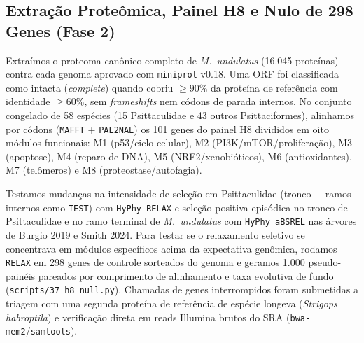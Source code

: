 \documentclass[10pt,a4paper,twocolumn]{article}
\begin{document}
\subsection{Extração Proteômica, Painel H8 e Nulo de 298 Genes (Fase 2)}
Extraímos o proteoma canônico completo de \textit{M.\ undulatus} (16.045 proteínas) contra cada genoma aprovado com \texttt{miniprot} v0.18. Uma ORF foi classificada como intacta (\textit{complete}) quando cobriu $\ge 90\%$ da proteína de referência com identidade $\ge 60\%$, sem \textit{frameshifts} nem códons de parada internos. No conjunto congelado de 58 espécies (15 Psittaculidae e 43 outros Psittaciformes), alinhamos por códons (\texttt{MAFFT} + \texttt{PAL2NAL}) os 101 genes do painel H8 divididos em oito módulos funcionais: M1 (p53/ciclo celular), M2 (PI3K/mTOR/proliferação), M3 (apoptose), M4 (reparo de DNA), M5 (NRF2/xenobióticos), M6 (antioxidantes), M7 (telômeros) e M8 (proteostase/autofagia).

Testamos mudanças na intensidade de seleção em Psittaculidae (tronco + ramos internos como \texttt{TEST}) com \texttt{HyPhy RELAX} e seleção positiva episódica no tronco de Psittaculidae e no ramo terminal de \textit{M.\ undulatus} com \texttt{HyPhy aBSREL} nas árvores de Burgio 2019 e Smith 2024. Para testar se o relaxamento seletivo se concentrava em módulos específicos acima da expectativa genômica, rodamos \texttt{RELAX} em 298 genes de controle sorteados do genoma e geramos 1.000 pseudo-painéis pareados por comprimento de alinhamento e taxa evolutiva de fundo (\texttt{scripts/37\_h8\_null.py}). Chamadas de genes interrompidos foram submetidas a triagem com uma segunda proteína de referência de espécie longeva (\textit{Strigops habroptila}) e verificação direta em reads Illumina brutos do SRA (\texttt{bwa-mem2}/\texttt{samtools}).
\end{document}

